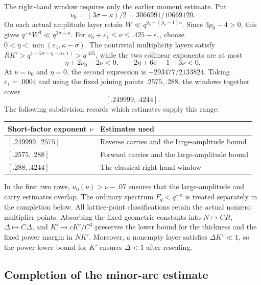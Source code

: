 \documentclass[11pt,a4paper]{article}
\theoremstyle{paperplain}
\numberwithin{equation}{section}
\begin{document}
The right-hand window requires only the earlier moment estimate. Put
\[
 \nu_0=(3\sigma-\kappa)/2=3066991/10669120.
\]
On each actual amplitude layer retain
$W\ll q^{g_0+(p_0-1)u}$. Since $3p_0-4>0$, this gives
$q^{-u}W^3\ll q^{3\sigma-\kappa}$.
For $\nu_0+\varepsilon_1\le\nu\le.425-\varepsilon_1$, choose
$0<\eta<\min(\varepsilon_1,\kappa-\sigma)$.
The nontrivial multiplicity layers satisfy
$RK'>q^{1-2\sigma-\eta-o(1)}>q^{.425}$, while the two collinear
exponents are at most
\[
 \eta+2\nu_0-2\nu<0,\qquad
 2\eta+6\sigma-1-3\nu<0.
\]
At $\nu=\nu_0$ and $\eta=0$, the second expression is
$-293477/2133824$. Taking $\varepsilon_1=.0004$ and using the fixed
joining points $.2575,.288$, the windows together cover
\begin{equation}\label{dec:rawwindow}
 [.249999,.4244].
\end{equation}
The following subdivision records which estimates supply this range:
\begin{center}
\begin{tabular}{ll}
\toprule
Short-factor exponent $\nu$ & Estimates used\\
\midrule
$[.249999,.2575]$ & Reverse carries and the large-amplitude bound\\
$[.2575,.288]$ & Forward carries and the large-amplitude bound\\
$[.288,.4244]$ & The classical right-hand window\\
\bottomrule
\end{tabular}
\end{center}
In the first two rows, $u_0(\nu)>\nu-.07$ ensures that the
large-amplitude and carry estimates overlap. The ordinary spectrum
$F_q<q^{-\kappa}$ is treated separately in the completion below.
All lattice-point classifications retain the actual nonzero multiplier
points. Absorbing the fixed geometric constants into
$N\mapsto CR$, $\Delta\mapsto C\Delta$, and
$K'\mapsto cK'/C^3$ preserves the lower bound for the thickness
and the fixed power margin in $NK'$.
Moreover, a nonempty layer satisfies $\Delta K'\ll1$, so the
power lower bound for $K'$ ensures $\Delta<1$ after rescaling.

\subsection{Completion of the minor-arc estimate}
\label{dec:typeii}
\end{document}
